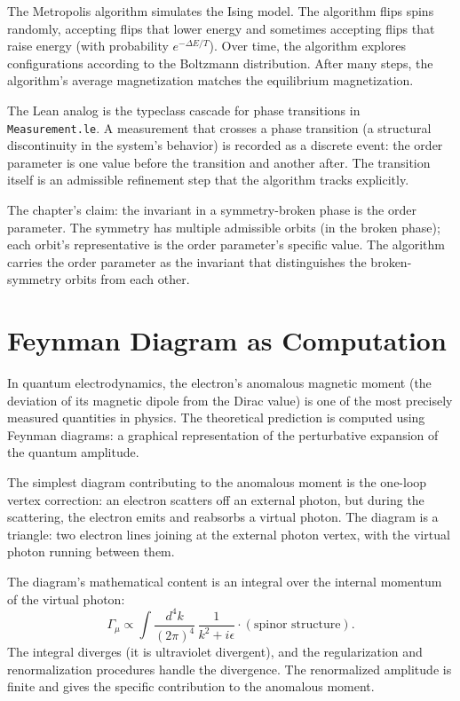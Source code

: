 The Metropolis algorithm simulates the Ising model. The algorithm
flips spins randomly, accepting flips that lower energy and
sometimes accepting flips that raise energy (with probability
$e^{-\Delta E/T}$). Over time, the algorithm explores configurations
according to the Boltzmann distribution. After many steps, the
algorithm's average magnetization matches the equilibrium
magnetization.

The Lean analog is the typeclass cascade for phase transitions in
\texttt{Measurement.le}. A measurement that crosses a phase
transition (a structural discontinuity in the system's behavior)
is recorded as a discrete event: the order parameter is one value
before the transition and another after. The transition itself is
an admissible refinement step that the algorithm tracks
explicitly.

The chapter's claim: the invariant in a symmetry-broken phase is
the order parameter. The symmetry has multiple admissible orbits
(in the broken phase); each orbit's representative is the order
parameter's specific value. The algorithm carries the order
parameter as the invariant that distinguishes the broken-symmetry
orbits from each other.

\section{Feynman Diagram as Computation}
\label{se:feynman-diagram-as-computation}

In quantum electrodynamics, the electron's anomalous magnetic
moment (the deviation of its magnetic dipole from the Dirac value)
is one of the most precisely measured quantities in physics. The
theoretical prediction is computed using Feynman diagrams: a
graphical representation of the perturbative expansion of the
quantum amplitude.

The simplest diagram contributing to the anomalous moment is the
one-loop vertex correction: an electron scatters off an external
photon, but during the scattering, the electron emits and reabsorbs
a virtual photon. The diagram is a triangle: two electron lines
joining at the external photon vertex, with the virtual photon
running between them.

The diagram's mathematical content is an integral over the
internal momentum of the virtual photon:
\[
\Gamma_\mu \propto \int \frac{d^4 k}{(2\pi)^4} \, \frac{1}{k^2 + i\epsilon}
\cdot (\text{spinor structure}).
\]
The integral diverges (it is ultraviolet divergent), and the
regularization and renormalization procedures handle the
divergence. The renormalized amplitude is finite and gives the
specific contribution to the anomalous moment.

